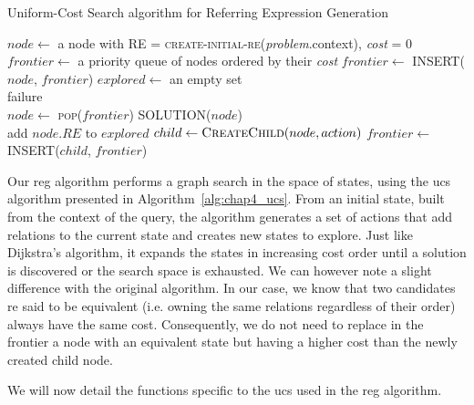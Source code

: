 \begin{algorithm}[ht!]
\caption{Uniform-Cost Search algorithm for Referring Expression Generation}
\label{alg:chap4_ucs}
\begin{algorithmic}
    \State $node\leftarrow$ a node with RE = \textsc{create-initial-re}(\textit{problem}.context), \textit{cost} = 0
    \State $frontier\leftarrow$ a priority queue of nodes ordered by their \textit{cost}
    \State $frontier\leftarrow$ \textsc{INSERT}($node$, $frontier$)
    \State $explored\leftarrow$ an empty set
    \\
    \Loop
        	\State \Return failure
        \EndIf
        \\
        \State $node\leftarrow$ \textsc{pop}($frontier$)
        	\State \Return \textsc{SOLUTION}($node$)
        \EndIf
        \\
        \State add $node.RE$ to $explored$
            \State $child \leftarrow \textsc{CreateChild}(node, action)$
            	\State $frontier\leftarrow$ \textsc{INSERT}($child$, $frontier$)
            \EndIf
        \EndFor
    \EndLoop
\EndFunction
\end{algorithmic}
\end{algorithm}

Our \acrshort{reg} algorithm performs a graph search in the space of states, using the \acrlong{ucs} algorithm presented in Algorithm~\ref{alg:chap4_ucs}.
From an initial state, built from the context of the query, the algorithm generates a set of actions that add relations to the current state and creates new states to explore. Just like Dijkstra's algorithm, it expands the states in increasing cost order until a solution is discovered or the search space is exhausted. We can however note a slight difference with the original algorithm. In our case, we know that two candidates \acrshort{re} said to be equivalent (i.e. owning the same relations regardless of their order) always have the same cost. Consequently, we do not need to replace in the frontier a node with an equivalent state but having a higher cost than the newly created child node.

\newpage

We will now detail the functions specific to the \acrshort{ucs} used in the \acrshort{reg} algorithm. \\


